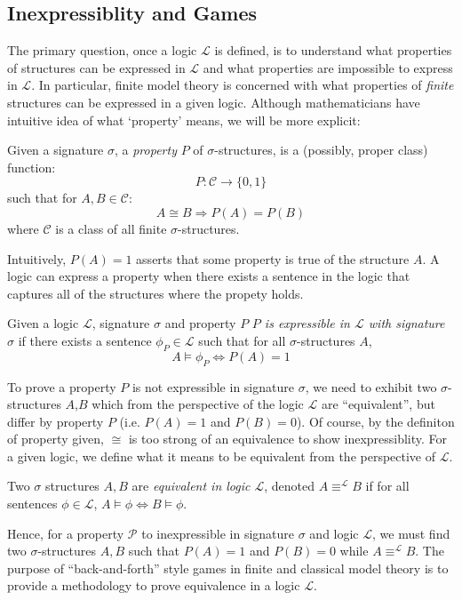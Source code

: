 \subsection{Inexpressiblity and Games}
The primary question, once a logic $\mathcal{L}$ is defined, is to understand what properties of structures can be expressed in $\mathcal{L}$ and what properties are impossible to express in $\mathcal{L}$. In particular, finite model theory is concerned with what properties of \textit{finite} structures can be expressed in a given logic. Although mathematicians have intuitive idea of what `property' means, we will be more explicit:
\begin{defn}
Given a signature $\sigma$, a \textit{property} $P$ of $\sigma$-structures, is a (possibly, proper class) function:
$$P:\mathcal{C} \longrightarrow \{0,1\}$$
such that for $A,B \in \mathcal{C}$:
$$A \cong B \Rightarrow P(A) = P(B)$$ 
where $\mathcal{C}$ is a class of all finite $\sigma$-structures.
\end{defn}
Intuitively, $P(A) = 1$ asserts that some property is true of the structure $A$. A logic can express a property when there exists a sentence in the logic that captures all of the structures where the propety holds. 
\begin{defn}
Given a logic $\mathcal{L}$, signature $\sigma$ and property $P$ \textit{$P$ is expressible in $\mathcal{L}$ with signature $\sigma$} if there exists a sentence $\phi_{P} \in \mathcal{L}$ such that for all $\sigma$-structures $A$,
$$A \vDash \phi_{P} \Leftrightarrow P(A) = 1$$
\end{defn}
To prove a property $P$ is not expressible in signature $\sigma$, we need to exhibit two $\sigma$-structures $A$,$B$ which from the perspective of the logic $\mathcal{L}$ are ``equivalent'', but differ by property $P$ (i.e. $P(A) = 1$ and $P(B) = 0$). Of course, by the definiton of property given, $\cong$ is too strong of an equivalence to show inexpressiblity. For a given logic, we define what it means to be equivalent from the perspective of $\mathcal{L}$.  
\begin{defn}
Two $\sigma$ structures $A,B$ are \textit{equivalent in logic $\mathcal{L}$}, denoted $A \equiv^{\mathcal{L}} B$ if for all sentences $\phi \in \mathcal{L}$, $A \vDash \phi \Leftrightarrow B \vDash \phi$.  
\label{defn:equivLogic}
\end{defn}
Hence, for a property $\mathcal{P}$ to inexpressible in signature $\sigma$ and logic $\mathcal{L}$, we must find two $\sigma$-structures $A,B$ such that $P(A) = 1$ and $P(B) = 0$ while $A \equiv^{\mathcal{L}} B$. The purpose of ``back-and-forth'' style games in finite and classical model theory is to provide a methodology to prove equivalence in a logic $\mathcal{L}$.  

